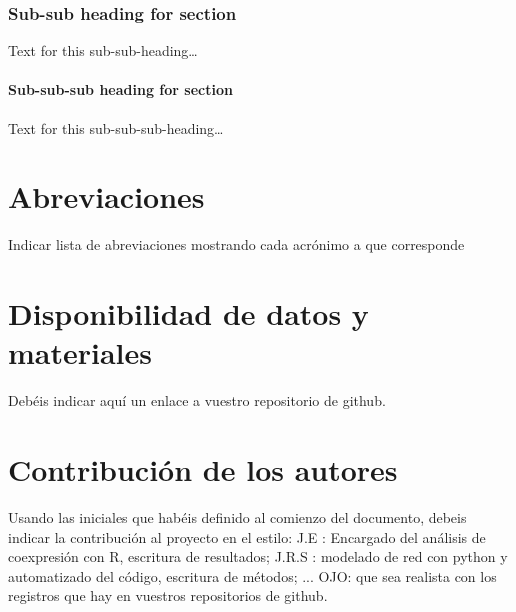 \documentclass{bmcart}
\begin{document}
			\subsubsection*{Sub-sub heading for section}
				Text for this sub-sub-heading\ldots
					
					\paragraph*{Sub-sub-sub heading for section}
						Text for this sub-sub-sub-heading\ldots
	
	
	
	
	
	
	
	
	
	
	
	\begin{backmatter}
	
		\section*{Abreviaciones}%
			Indicar lista de abreviaciones mostrando cada acrónimo a que corresponde
		
		\section*{Disponibilidad de datos y materiales}%
			Debéis indicar aquí un enlace a vuestro repositorio de github.
		
		\section*{Contribución de los autores}
			Usando las iniciales que habéis definido al comienzo del documento, debeis indicar la contribución al proyecto en el estilo:
			J.E : Encargado del análisis de coexpresión con R, escritura de resultados; J.R.S : modelado de red con python y automatizado del código, escritura de métodos; ...
			OJO: que sea realista con los registros que hay en vuestros repositorios de github. 
		
		
		
	
	\end{backmatter}
\end{document}
